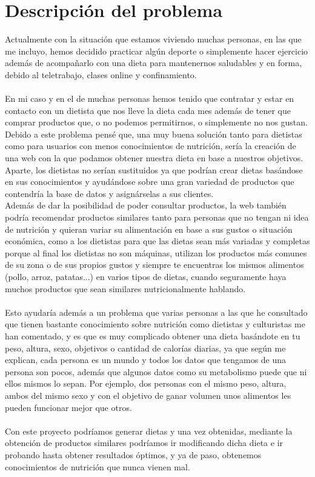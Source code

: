 \section{Descripción del problema} \label{sec:problema}

Actualmente con la situación que estamos viviendo muchas personas, en las que me incluyo, hemos 
decidido practicar algún deporte o simplemente hacer ejercicio además de acompañarlo con una dieta 
para mantenernos saludables y en forma, debido al teletrabajo, clases online y confinamiento.
\\\\
En mi caso y en el de muchas personas hemos tenido que contratar y estar en contacto con un dietista que nos lleve la dieta 
cada mes además de tener que comprar productos que, o no podemos permitirnos, o simplemente no nos gustan.\\

Debido a este problema pensé que, una muy buena solución tanto para dietistas como para usuarios con menos conocimientos de 
nutrición, sería la creación de una web con la que podamos obtener nuestra dieta en base a nuestros objetivos. Aparte, los 
dietistas no serían sustituidos ya que podrían crear dietas basándose en sus conocimientos y ayudándose sobre una gran variedad 
de productos que contendría la base de datos y asignárselas a sus clientes.\\

Además de dar la posibilidad de poder consultar productos, la web también podría recomendar productos similares tanto para personas que no 
tengan ni idea de nutrición y quieran variar su alimentación en base a sus gustos o situación económica, como a los dietistas para que 
las dietas sean más variadas y completas porque al final los dietistas no son máquinas, utilizan los productos más comunes de su zona o de sus propios gustos
y siempre te encuentras los mismos alimentos (pollo, arroz, patatas...) en varios tipos de dietas, cuando seguramente haya muchos productos que
sean similares nutricionalmente hablando.
\\\\
Esto ayudaría además a un problema que varias personas a las que he consultado que tienen bastante conocimiento sobre nutrición como dietistas y culturistas me han comentado, 
y es que es muy complicado obtener una dieta basándote en tu peso, altura, sexo, objetivos o cantidad de calorías diarias, ya que según me explican,
cada persona es un mundo y todos los datos que tengamos de una persona son pocos, además que algunos datos como su metabolismo puede que ni ellos mismos lo sepan.
Por ejemplo, dos personas con el mismo peso, altura, ambos del mismo sexo y con el objetivo de ganar volumen unos alimentos les pueden funcionar mejor que otros.\\ \\

Con este proyecto podríamos generar dietas y una vez obtenidas, mediante la obtención de productos similares podríamos ir modificando dicha dieta e ir probando hasta obtener resultados
óptimos, y ya de paso, obtenemos conocimientos de nutrición que nunca vienen mal.